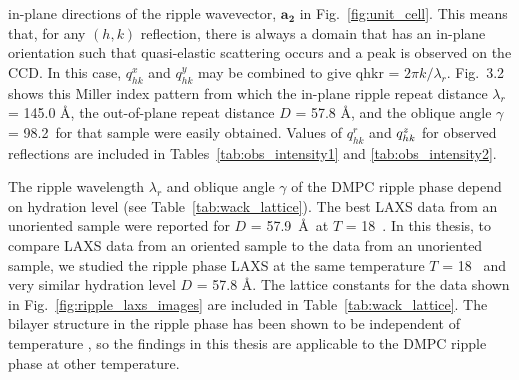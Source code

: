 in-plane directions of the
ripple wavevector, $\mathbf{a_2}$ 
in Fig.~\ref{fig:unit_cell}. 
This means that, for any $(h,k)$ reflection, there is always a domain that has 
an in-plane orientation such that quasi-elastic scattering occurs and a peak 
is observed on the CCD.  
In this case, $q_{hk}^x$ and $q_{hk}^y$ may be combined to 
give \gls{qhkr} = $2\pi k/\lambda_r$.  
Fig.~3.2 shows this Miller index pattern from which the in-plane ripple repeat 
distance $\lambda_r$ = 145.0 \AA, the out-of-plane repeat distance 
$D$ = 57.8 \AA, and the oblique angle $\gamma$ = 98.2\textdegree\ for that 
sample were easily obtained.
Values of $q_{hk}^r$ and $q_{hk}^z$ for observed reflections are included
in Tables~\ref{tab:obs_intensity1} and \ref{tab:obs_intensity2}.

The ripple wavelength $\lambda_r$ and oblique angle $\gamma$ of the DMPC
ripple phase depend on hydration level \cite{ref:Wack89} 
(see Table~\ref{tab:wack_lattice}).
The best LAXS data from an unoriented sample were reported for $D$ = 57.9~\AA\ 
at $T$ = 18~\textcelsius. In this thesis, 
to compare LAXS data from an oriented sample to the data from 
an unoriented sample,
we studied the ripple phase LAXS at the same temperature $T$ = 18 \textcelsius\ 
and very similar hydration level $D$ = 57.8 \AA.
The lattice constants for the data shown in Fig.~\ref{fig:ripple_laxs_images} are 
included in Table~\ref{tab:wack_lattice}.
The bilayer structure in the ripple phase has been shown to be independent 
of temperature \cite{ref:Sengupta03}, so the findings in this thesis are
applicable to the DMPC ripple phase at other temperature.

